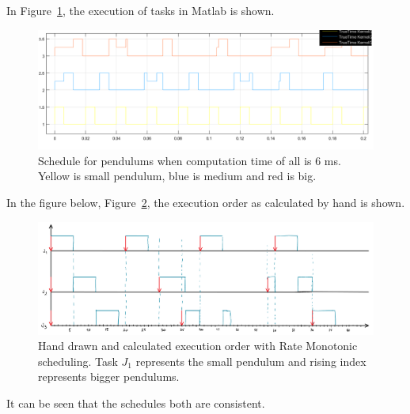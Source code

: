 \documentclass[10pt, a4paper]{article}
\begin{document}
{
    In Figure~\ref{fig:Task_4_sch_6ms}, the execution of tasks in Matlab is
    shown.
    \begin{figure}[H]
        \centering
        \includegraphics[width=1\linewidth]{../Matlab/HW2_sources_Windows64bit/images/Task_4_sch_6ms.png}
        \caption{Schedule for pendulums when computation time of all is 6 ms.
        Yellow is small pendulum, blue is medium and red is big.}
        \label{fig:Task_4_sch_6ms}
    \end{figure}
    In the figure below, Figure~\ref{fig:Task_4_sch_6ms_drawn}, the execution
    order as calculated by hand is shown.
    \begin{figure}[htpb]
        \centering
        \includegraphics[width=1\linewidth]{../Matlab/HW2_sources_Windows64bit/images/rm_tasks.PNG}
        \caption{Hand drawn and calculated execution order with Rate Monotonic
        scheduling. Task $J_1$ represents the small pendulum and rising index
        represents bigger pendulums.}
        \label{fig:Task_4_sch_6ms_drawn}
    \end{figure}
    It can be seen that the schedules both are consistent.
}
    
\end{document}
